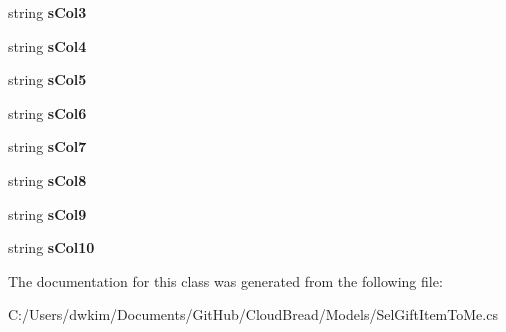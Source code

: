 \begin{DoxyCompactItemize}
\item 
string {\bfseries s\+Col3}\hypertarget{a00089_ac3ff1cc2abca5218c89ce7d7e1dff615}{}\label{a00089_ac3ff1cc2abca5218c89ce7d7e1dff615}

\item 
string {\bfseries s\+Col4}\hypertarget{a00089_a598de01d33b2c8ca8b53a9dc60649adf}{}\label{a00089_a598de01d33b2c8ca8b53a9dc60649adf}

\item 
string {\bfseries s\+Col5}\hypertarget{a00089_a46c17321aeded5fd7df753628f4e356a}{}\label{a00089_a46c17321aeded5fd7df753628f4e356a}

\item 
string {\bfseries s\+Col6}\hypertarget{a00089_a82598e8afedd842684e7fd078d86c091}{}\label{a00089_a82598e8afedd842684e7fd078d86c091}

\item 
string {\bfseries s\+Col7}\hypertarget{a00089_a1ba624ee92dea384282e034abe1b7d27}{}\label{a00089_a1ba624ee92dea384282e034abe1b7d27}

\item 
string {\bfseries s\+Col8}\hypertarget{a00089_a75af63b0e919abd60fb31fab88b743aa}{}\label{a00089_a75af63b0e919abd60fb31fab88b743aa}

\item 
string {\bfseries s\+Col9}\hypertarget{a00089_a3fe900975ff0fe2601459d1415daa21e}{}\label{a00089_a3fe900975ff0fe2601459d1415daa21e}

\item 
string {\bfseries s\+Col10}\hypertarget{a00089_a53330532fa12ef9f9100b392178d9118}{}\label{a00089_a53330532fa12ef9f9100b392178d9118}

\end{DoxyCompactItemize}


The documentation for this class was generated from the following file\+:\begin{DoxyCompactItemize}
\item 
C\+:/\+Users/dwkim/\+Documents/\+Git\+Hub/\+Cloud\+Bread/\+Models/Sel\+Gift\+Item\+To\+Me.\+cs\end{DoxyCompactItemize}
